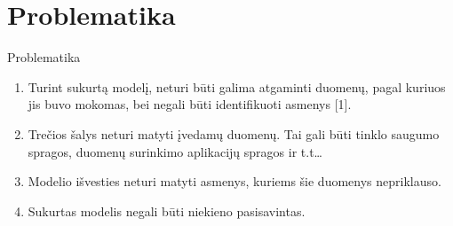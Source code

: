 \section{Problematika}

 \begin{frame}[c]{Problematika}

    \begin{enumerate}
        \item Turint sukurtą modelį, neturi būti galima atgaminti duomenų, pagal kuriuos jis buvo mokomas, bei negali būti identifikuoti asmenys [1]. 
        \item Trečios šalys neturi matyti įvedamų duomenų. Tai gali būti tinklo saugumo spragos, duomenų surinkimo aplikacijų spragos ir t.t…
        \item Modelio išvesties neturi matyti asmenys, kuriems šie duomenys nepriklauso.
        \item Sukurtas modelis negali būti niekieno pasisavintas. 
    \end{enumerate}

 \end{frame}